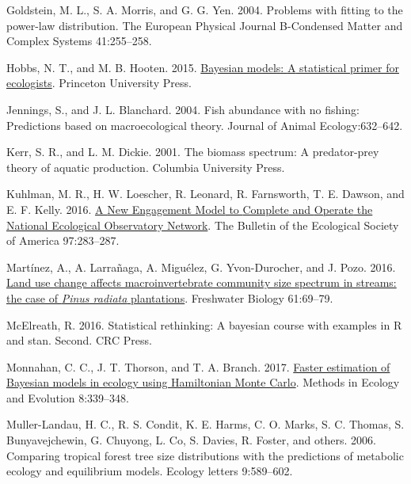\documentclass[
  12pt,
]{article}
\newlength{\cslhangindent}
\newlength{\cslentryspacingunit} %
\newenvironment{CSLReferences}[2] %
 {%
  \setlength{\parindent}{0pt}
  \ifodd #1
  \let\oldpar\par
  \def\par{\hangindent=\cslhangindent\oldpar}
  \fi
  \setlength{\parskip}{#2\cslentryspacingunit}
 }%
 {}
\begin{document}
\begin{CSLReferences}{1}{0}
\leavevmode{}%
Goldstein, M. L., S. A. Morris, and G. G. Yen. 2004. Problems with
fitting to the power-law distribution. The European Physical Journal
B-Condensed Matter and Complex Systems 41:255--258.

\leavevmode{}%
Hobbs, N. T., and M. B. Hooten. 2015.
\href{https://doi.org/10.23943/princeton/9780691159287.001.0001}{Bayesian
models: {A} statistical primer for ecologists}. {Princeton University
Press}.

\leavevmode{}%
Jennings, S., and J. L. Blanchard. 2004. Fish abundance with no fishing:
Predictions based on macroecological theory. Journal of Animal
Ecology:632--642.

\leavevmode{}%
Kerr, S. R., and L. M. Dickie. 2001. The biomass spectrum: {A}
predator-prey theory of aquatic production. {Columbia University Press}.

\leavevmode{}%
Kuhlman, M. R., H. W. Loescher, R. Leonard, R. Farnsworth, T. E. Dawson,
and E. F. Kelly. 2016. \href{https://doi.org/10.1002/bes2.1248}{A {New
Engagement Model} to {Complete} and {Operate} the {National Ecological
Observatory Network}}. The Bulletin of the Ecological Society of America
97:283--287.

\leavevmode{}%
Martínez, A., A. Larrañaga, A. Miguélez, G. Yvon-Durocher, and J. Pozo.
2016. \href{https://doi.org/10.1111/fwb.12680}{Land use change affects
macroinvertebrate community size spectrum in streams: the case of
{\emph{Pinus radiata}} plantations}. Freshwater Biology 61:69--79.

\leavevmode{}%
McElreath, R. 2016. Statistical rethinking: {A} bayesian course with
examples in {R} and stan. Second. {CRC Press}.

\leavevmode{}%
Monnahan, C. C., J. T. Thorson, and T. A. Branch. 2017.
\href{https://doi.org/10.1111/2041-210X.12681}{Faster estimation of
{Bayesian} models in ecology using {Hamiltonian Monte Carlo}}. Methods
in Ecology and Evolution 8:339--348.

\leavevmode{}%
Muller-Landau, H. C., R. S. Condit, K. E. Harms, C. O. Marks, S. C.
Thomas, S. Bunyavejchewin, G. Chuyong, L. Co, S. Davies, R. Foster, and
others. 2006. Comparing tropical forest tree size distributions with the
predictions of metabolic ecology and equilibrium models. Ecology letters
9:589--602.


\end{CSLReferences}
\end{document}
